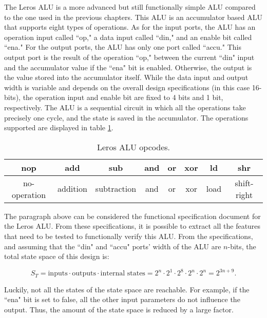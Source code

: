 The Leros ALU is a more advanced but still functionally simple ALU compared to
the one used in the previous chapters. This ALU is an accumulator based ALU that
supports eight types of operations. As for the input ports, the ALU has an
operation input called ``op," a data input called ``din," and an enable bit
called ``ena." For the output ports, the ALU has only one port called ``accu."
This output port is the result of the operation ``op," between the current
``din" input and the accumulator value if the ``ena" bit is enabled. Otherwise,
the output is the value stored into the accumulator itself. While the data input
and output width is variable and depends on the overall design specifications
(in this case 16-bits), the operation input and enable bit are fixed to 4 bits
and 1 bit, respectively. The ALU is a sequential circuit in which all the
operations take precisely one cycle, and the state is saved in the accumulator.
The operations supported are displayed in table \ref{table:leros:op}.

\begin{table}[!h]
\centering
\begin{tabular}{c|c|c|c|c|c|c|c}
 \textbf{nop} & \textbf{add} & \textbf{sub} & \textbf{and} & \textbf{or} & \textbf{xor} & \textbf{ld} & \textbf{shr}\\
 \hline
no-operation & addition & subtraction & and & or & xor & load & shift-right\\
\end{tabular}
\caption{Leros ALU opcodes.}
\label{table:leros:op}
\end{table}


The paragraph above can be considered the functional specification document for
the Leros ALU. From these specifications, it is possible to extract all the
features that need to be tested to functionally verify this ALU. From the
specifications, and assuming that the ``din" and ``accu" ports' width of the ALU
are $n$-bits, the total state space of this design is:

\begin{equation*}
   S_T = \text{inputs} \cdot \text{outputs} \cdot \text{internal states} =  2^{n} \cdot 2^1 \cdot 2^8 \cdot 2^n \cdot 2^n = 2^{3n + 9}.
\end{equation*}

Luckily, not all the states of the state space are reachable. For example, if
the ``ena" bit is set to false, all the other input parameters do not influence
the output. Thus, the amount of the state space is reduced by a large factor.

